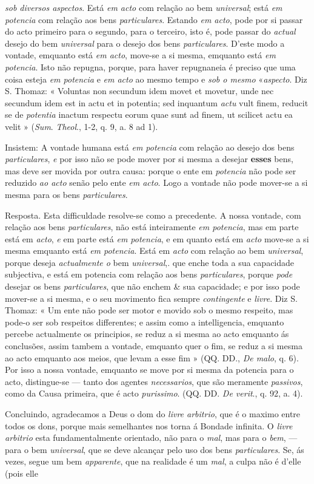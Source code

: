 \emph{sob diversos aspectos}. Está \emph{em acto} com relação ao bem \emph{universal}; está \emph{em potencia} com relação aos bens \emph{particulares}. Estando \emph{em acto}, pode por si passar do acto primeiro para o segundo, para o terceiro, isto é, pode passar do \emph{actual} desejo do bem \emph{universal} para o desejo dos bens \emph{particulares}. D'este modo a vontade, emquanto está \emph{em acto}, move-se a si mesma, emquanto está \emph{em potencia}. Isto não repugna, porque, para haver repugnaneia é preciso que uma coisa esteja \emph{em potencia} e \emph{em acto} ao mesmo tempo e \emph{sob o mesmo} «\emph{aspecto}. Diz S. Thomaz: « Voluntas non secundum idem movet et movetur, unde nec secundum idem est in actu et in potentia; sed inquantum \emph{actu} vult finem, reducit se de \emph{potentia} inactum respectu eorum quae sunt ad finem, ut scilicet actu ea velit » (\emph{Sum}. \emph{Theol}., 1-2, q. 9, a. 8 ad 1).\par Insistem: A vontade humana está \emph{em potencia} com relação ao desejo dos bens \emph{particulares}, \emph{e} por isso não se pode mover por si mesma a desejar \textbf{esses} bens, mas deve ser movida por outra causa: porque o ente em \emph{potencia} não pode ser reduzido \emph{ao acto} senão pelo ente \emph{em acto}. Logo a vontade não pode mover-se a si mesma para os bens \emph{particulares}.\par Resposta. Esta difficuldade resolve-se como a precedente. A nossa vontade, com relação aos bens \emph{particulares}, não está inteiramente \emph{em potencia}, mas em parte está em \emph{acto}, \emph{e} em parte está \emph{em potencia}, e em quanto está em \emph{acto} move-se a si mesma emquanto está \emph{em potencia}. Está em \emph{acto} com relação ao bem \emph{universal}, porque deseja \emph{actualmente o} bem \emph{universal},. que enche toda a sua capacidade subjectiva, e está em potencia com relação aos bens \emph{particulares}, porque \emph{pode} desejar os bens \emph{particulares}, que não enchem \& sua capacidade; e por isso pode mover-se a si mesma, e o seu movimento fica sempre \emph{contingente} e \emph{livre}. Diz S. Thomaz: « Um ente não pode ser motor e movido sob o mesmo respeito, mas pode-o ser sob respeitos differentes; e assim como a intelligencia, emquanto percebe actualmente os principios, se reduz a si mesma ao acto emquanto ás conclusões, assim tambem a vontade, emquanto quer o fim, se reduz a si mesma ao acto emquanto aos meios, que levam a esse fim » (QQ. DD., \emph{De malo}, q. 6). Por isso a nossa vontade, emquanto se move por si mesma da potencia para o acto, distingue-se --- tanto dos agentes \emph{necessarios}, que são meramente \emph{passivos}, como da Causa primeira, que é acto \emph{purissimo}. (QQ. DD. \emph{De verit}., q. 92, a. 4).\par Concluindo, agradecamos a Deus o dom do \emph{livre arbitrio}, que é o maximo entre todos os dons, porque mais semelhantes nos torna á Bondade infinita. O \emph{livre arbitrio} esta fundamentalmente orientado, não para o \emph{mal}, mas para o \emph{bem}, --- para o bem \emph{universal}, que se deve alcançar pelo uso dos bens \emph{particulares}. Se, ás vezes, segue um bem \emph{apparente}, que na realidade é um \emph{mal}, a culpa não é d'elle (pois elle 